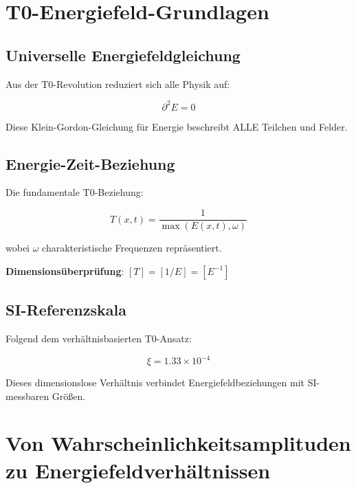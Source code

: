 \documentclass[12pt,a4paper]{article}
\newcommand{\Tfield}{T}
\newcommand{\Efield}{E}
\newcommand{\xipar}{\xi}
\begin{document}
	\section{T0-Energiefeld-Grundlagen}
	
	\subsection{Universelle Energiefeldgleichung}
	
	Aus der T0-Revolution reduziert sich alle Physik auf:
	
	\begin{equation}
		\boxed{\partial^2 \Efield = 0}
		\label{eq:universal_field_equation}
	\end{equation}
	
	Diese Klein-Gordon-Gleichung für Energie beschreibt ALLE Teilchen und Felder.
	
	\subsection{Energie-Zeit-Beziehung}
	
	Die fundamentale T0-Beziehung:
	
	\begin{equation}
		\boxed{\Tfield(x,t) = \frac{1}{\max(\Efield(x,t), \omega)}}
		\label{eq:energy_time_relation}
	\end{equation}
	
	wobei $\omega$ charakteristische Frequenzen repräsentiert.
	
	\textbf{Dimensionsüberprüfung}: $[\Tfield] = [1/E] = [E^{-1}]$ \checkmark
	
	\subsection{SI-Referenzskala}
	
	Folgend dem verhältnisbasierten T0-Ansatz:
	
	\begin{equation}
		\boxed{\xipar = 1.33 \times 10^{-4}}
		\label{eq:si_reference_scale}
	\end{equation}
	
	Dieses dimensionslose Verhältnis verbindet Energiefeldbeziehungen mit SI-messbaren Größen.
	
	\section{Von Wahrscheinlichkeitsamplituden zu Energiefeldverhältnissen}
	
\end{document}
